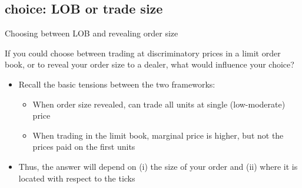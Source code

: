 \documentclass[english,10pt]{beamer}
\begin{document}
\subsection{choice: LOB or trade size} 

\begin{frame}{Choosing between LOB and revealing order size}
	\begin{exampleblock}{}
		If you could choose between trading at discriminatory prices in a limit order book, or to reveal your order size to a dealer, what would influence your choice?
	\end{exampleblock}
	\begin{itemize}
		\item Recall the basic tensions between the two frameworks: 
		\begin{itemize}
			\item When order size revealed, can trade all units at single (low-moderate) price
			\item When trading in the limit book, marginal price is higher, but not the prices paid on the first units
		\end{itemize}
		\item Thus, the answer will depend on (i) the size of your order and (ii) where it is located with respect to the ticks
	\end{itemize}
\end{frame}
\end{document}
